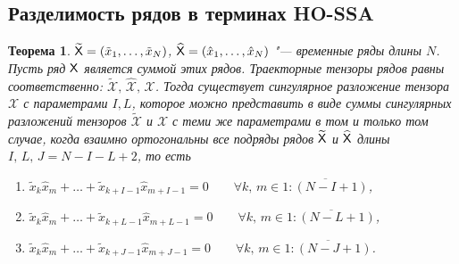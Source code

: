 \documentclass[specialist,
    substylefile = spbu.rtx,
    subf,href,colorlinks=true, 12pt]{disser}
\theoremstyle{plain}
\newtheorem{theorem}{Теорема}
\theoremstyle{definition}
\theoremstyle{remark}
\begin{document}
    \subsection{Разделимость рядов в терминах HO-SSA}\label{subsec:tensor-ssa-separability}
    \begin{theorem}
        \label{state:separability}
        $\widetilde{\mathsf{X}}=(\tilde{x}_1,\ldots , \tilde{x}_N)$, 
        $\widehat{\mathsf{X}}=(\hat{x}_1,\ldots , \hat{x}_N)$ "--- временные ряды длины $N$.
        Пусть ряд $\mathsf{X}$ является суммой этих рядов.
        Траекторные тензоры рядов равны соответственно: $\widetilde{\mathcal{X}},\, 
        \widehat{\mathcal{X}},\, \mathcal{X}$.
        Тогда существует сингулярное разложение тензора $\mathcal{X}$ с параметрами $I, L$, которое можно представить
        в виде суммы сингулярных разложений тензоров $\widetilde{\mathcal{X}}$ и $\widehat{\mathcal{X}}$
        с теми же параметрами в том и только том случае, когда взаимно ортогональны все подряды рядов
         $\widetilde{\mathsf{X}}$ и $\widehat{\mathsf{X}}$ длины $I,\, L,\, J=N-I-L+2$, то есть
        \begin{enumerate}
            \item $\tilde{x}_{k}\hat{x}_m + \ldots + \tilde{x}_{k+I-1} \hat{x}_{m+I-1}=0 \qquad \forall k,\, m\in\overline{1:(N-I+1)}$,
            \item $\tilde{x}_{k}\hat{x}_m + \ldots + \tilde{x}_{k+L-1} \hat{x}_{m+L-1}=0 \qquad \forall k,\, m\in\overline{1:(N-L+1)}$,
            \item $\tilde{x}_{k}\hat{x}_m + \ldots + \tilde{x}_{k+J-1} \hat{x}_{m+J-1}=0 \qquad \forall k,\, m\in\overline{1:(N-J+1)}$.
        \end{enumerate}
    \end{theorem}
\end{document}
